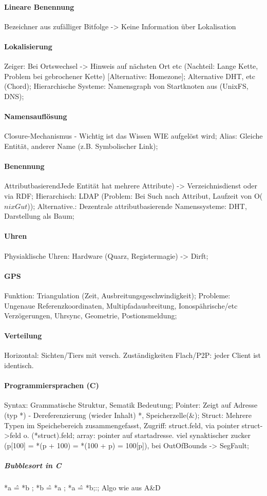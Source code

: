 \documentclass[pagesize,11pt,a4paper]{scrartcl}
\begin{document}
\paragraph*{Lineare Benennung}
	Bezeichner aus zufälliger Bitfolge -> Keine Information über Lokalisation

\paragraph*{Lokalisierung}
	Zeiger: Bei Ortswechsel -> Hinweis auf nächsten Ort etc (Nachteil: Lange Kette, Problem bei gebrochener Kette) [Alternative: Homezone];
	Alternative DHT, etc (Chord);
	Hierarchische Systeme: Namensgraph von Startknoten aus (UnixFS, DNS);

\paragraph*{Namensauflösung}
	Closure-Mechanismus - Wichtig ist das Wissen WIE aufgelöst wird;
	Alias: Gleiche Entität, anderer Name (z.B. Symbolischer Link);

\paragraph*{Benennung}
	AttributbasierendJede Entität hat mehrere Attribute) -> Verzeichnisdienst oder via RDF;
	Hierarchisch: LDAP (Problem: Bei Such nach Attribut, Laufzeit von O($nixGut$));
	Alternative.: Dezentrale attributbasierende Namenssysteme: DHT, Darstellung als Baum;

\paragraph*{Uhren}
	Physiaklische Uhren: Hardware (Quarz, Registermagie) -> Dirft;

\paragraph*{GPS}
	Funktion: Triangulation (Zeit, Ausbreitungsgeschwindigkeit);
	Probleme: Ungenaue Referenzkoordinaten, Multipfadausbreitung, Ionospährische/etc Verzögerungen, Uhrsync, Geometrie, Postionsmeldung;
	
\paragraph*{Verteilung}
	Horizontal: Sichten/Tiers mit versch. Zuständigkeiten
	Flach/P2P: jeder Client ist identisch.

\paragraph*{Programmiersprachen (C)}
	Syntax: Grammatische Struktur, Sematik Bedeutung;
	Pointer: Zeigt auf Adresse (typ *) - Dereferenzierung (wieder Inhalt) *, Speicherzelle(\&);
	Struct: Mehrere Typen im Speichebereich zusammengefasst, Zugriff: struct.feld, via pointer struct->feld o. (*struct).feld;
	array: pointer auf startadresse. viel synaktischer zucker (p[100] = *(p + 100) = *(100 + p) = 100[p]), bei OutOfBounds -> SegFault;

\subparagraph*{Bubblesort in C}
	*a \^= *b ; *b \^= *a ; *a \^= *b;:;
	Algo wie aus A\&D
\end{document}
